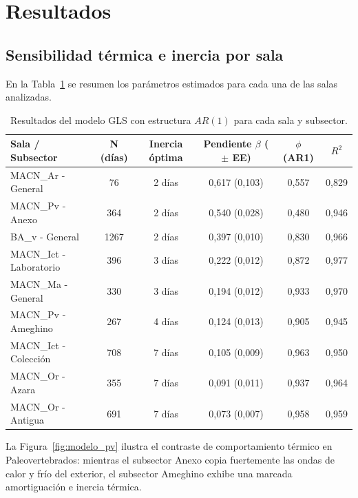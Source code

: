 \documentclass[11pt,a4paper]{article}
\begin{document}
\section{Resultados}

\subsection{Sensibilidad térmica e inercia por sala}
En la Tabla~\ref{tab:inercia} se resumen los parámetros estimados para cada una de las salas analizadas.

\begin{table}[htbp]
\centering
\small
\caption{Resultados del modelo GLS con estructura $AR(1)$ para cada sala y subsector.}
\label{tab:inercia}
\begin{tabular}{l c c c c c}
\toprule
\textbf{Sala / Subsector} & \textbf{N (días)} & \textbf{Inercia óptima} & \textbf{Pendiente $\beta$ ($\pm$ EE)} & \textbf{$\phi$ (AR1)} & \textbf{$R^2$} \\
\midrule
MACN\_Ar - General     & 76   & 2 días & 0,617 (0,103) & 0,557 & 0,829 \\
MACN\_Pv - Anexo       & 364  & 2 días & 0,540 (0,028) & 0,480 & 0,946 \\
BA\_v - General        & 1267 & 2 días & 0,397 (0,010) & 0,830 & 0,966 \\
MACN\_Ict - Laboratorio& 396  & 3 días & 0,222 (0,012) & 0,872 & 0,977 \\
MACN\_Ma - General     & 330  & 3 días & 0,194 (0,012) & 0,933 & 0,970 \\
MACN\_Pv - Ameghino    & 267  & 4 días & 0,124 (0,013) & 0,905 & 0,945 \\
MACN\_Ict - Colección  & 708  & 7 días & 0,105 (0,009) & 0,963 & 0,950 \\
MACN\_Or - Azara       & 355  & 7 días & 0,091 (0,011) & 0,937 & 0,964 \\
MACN\_Or - Antigua     & 691  & 7 días & 0,073 (0,007) & 0,958 & 0,959 \\
\bottomrule
\end{tabular}
\end{table}

La Figura~\ref{fig:modelo_pv} ilustra el contraste de comportamiento térmico en Paleovertebrados: mientras el subsector Anexo copia fuertemente las ondas de calor y frío del exterior, el subsector Ameghino exhibe una marcada amortiguación e inercia térmica.
\end{document}
